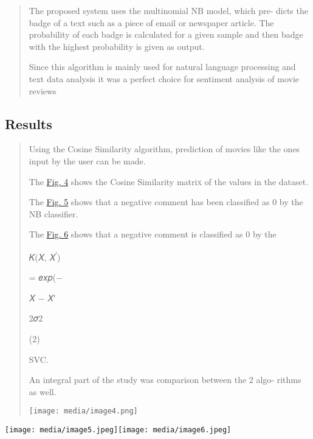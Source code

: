 \documentclass[
]{article}
\begin{document}
\begin{quote}
The proposed system uses the multinomial NB model, which pre- dicts the
badge of a text such as a piece of email or newspaper article. The
probability of each badge is calculated for a given sample and then
badge with the highest probability is given as output.

Since this algorithm is mainly used for natural language processing and
text data analysis it was a perfect choice for sentiment analysis of
movie reviews
\end{quote}

\hypertarget{results}{%
\subsection{Results}\label{results}}

\begin{quote}
Using the Cosine Similarity algorithm, prediction of movies like the
ones input by the user can be made.

The \protect\hyperlink{_bookmark12}{Fig. 4} shows the Cosine Similarity
matri\textsc{x} of the values in the dataset.

The \protect\hyperlink{_bookmark12}{Fig. 5} shows that a negative
comment has been classiﬁed as 0 by the NB classiﬁer.

The \protect\hyperlink{_bookmark12}{Fig. 6} shows that a negative
comment is classiﬁed as 0 by the

\protect\hypertarget{_bookmark11}{}{}𝐾(𝑋, 𝑋\textsuperscript{′})

= 𝑒𝑥𝑝(−

𝑋 − 𝑋′

2𝜎2

(2)

SVC.

An integral part of the study was comparison between the 2 algo- rithms
as well.

\texttt{[image: media/image4.png]}
\end{quote}

\texttt{[image: media/image5.jpeg]}\texttt{[image: media/image6.jpeg]}
\end{document}
